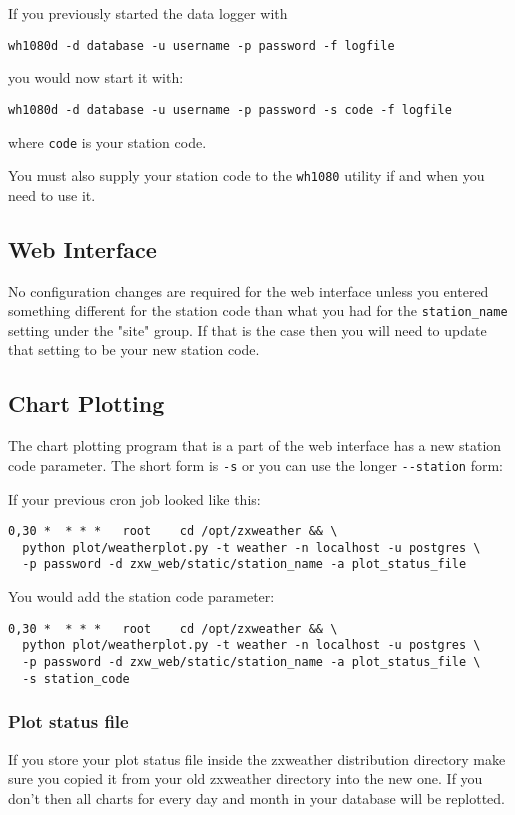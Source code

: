 \documentclass[a4paper,10pt,draft]{book}
\begin{document}
If you previously started the data logger with
\begin{verbatim}
wh1080d -d database -u username -p password -f logfile
\end{verbatim}

you would now start it with:
\begin{verbatim}
wh1080d -d database -u username -p password -s code -f logfile
\end{verbatim}
where \verb|code| is your station code.

You must also supply your station code to the \verb|wh1080| utility if and when you need to use it.

\subsection{Web Interface}
No configuration changes are required for the web interface unless you entered something different for the station code than what you had for the \verb|station_name| setting under the "site" group. If that is the case then you will need to update that setting to be your new station code.

\subsection{Chart Plotting}
The chart plotting program that is a part of the web interface has a new station code parameter. The short form is \verb|-s| or you can use the longer \verb|--station| form:

If your previous cron job looked like this:
\begin{verbatim}
0,30 *  * * *   root    cd /opt/zxweather && \
  python plot/weatherplot.py -t weather -n localhost -u postgres \
  -p password -d zxw_web/static/station_name -a plot_status_file
\end{verbatim}

You would add the station code parameter:
\begin{verbatim}
0,30 *  * * *   root    cd /opt/zxweather && \
  python plot/weatherplot.py -t weather -n localhost -u postgres \
  -p password -d zxw_web/static/station_name -a plot_status_file \
  -s station_code
\end{verbatim}

\subsubsection{Plot status file}
If you store your plot status file inside the zxweather distribution directory make sure you copied it from your old zxweather directory into the new one. If you don't then all charts for every day and month in your database will be replotted.
\end{document}
